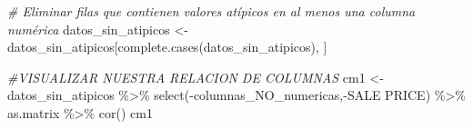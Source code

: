 \documentclass[
]{article}
\newenvironment{Shaded}{\begin{snugshade}}{\end{snugshade}}
\newcommand{\AttributeTok}[1]{\textcolor[rgb]{0.77,0.63,0.00}{#1}}
\newcommand{\CommentTok}[1]{\textcolor[rgb]{0.56,0.35,0.01}{\textit{#1}}}
\newcommand{\FunctionTok}[1]{\textcolor[rgb]{0.00,0.00,0.00}{#1}}
\newcommand{\NormalTok}[1]{#1}
\newcommand{\OtherTok}[1]{\textcolor[rgb]{0.56,0.35,0.01}{#1}}
\newcommand{\SpecialCharTok}[1]{\textcolor[rgb]{0.00,0.00,0.00}{#1}}
\newcommand{\StringTok}[1]{\textcolor[rgb]{0.31,0.60,0.02}{#1}}
\begin{document}
\begin{Shaded}
\begin{Highlighting}[]
\CommentTok{\# Eliminar filas que contienen valores atípicos en al menos una columna numérica}
\NormalTok{datos\_sin\_atipicos }\OtherTok{\textless{}{-}}\NormalTok{ datos\_sin\_atipicos[}\FunctionTok{complete.cases}\NormalTok{(datos\_sin\_atipicos), ]}

\CommentTok{\#VISUALIZAR NUESTRA RELACION DE COLUMNAS}
\NormalTok{cm1 }\OtherTok{\textless{}{-}}\NormalTok{ datos\_sin\_atipicos }\SpecialCharTok{\%\textgreater{}\%} \FunctionTok{select}\NormalTok{(}\SpecialCharTok{{-}}\NormalTok{columnas\_NO\_numericas,}\SpecialCharTok{{-}}\StringTok{\textasciigrave{}}\AttributeTok{SALE PRICE}\StringTok{\textasciigrave{}}\NormalTok{) }\SpecialCharTok{\%\textgreater{}\%}\NormalTok{ as.matrix }\SpecialCharTok{\%\textgreater{}\%} \FunctionTok{cor}\NormalTok{()}
\NormalTok{cm1}
\end{Highlighting}
\end{Shaded}
\end{document}
